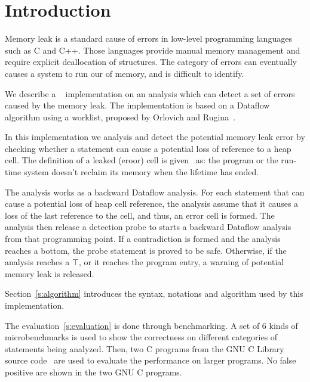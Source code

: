 \section{Introduction}
Memory leak is a standard cause of errors in low-level programming languages
such as C and C++. Those languages provide manual memory management and require
explicit deallocation of structures. The category of errors can eventually
causes a system to run our of memory, and is difficult to identify.

We describe a \llvm~\cite{llvm} implementation on an analysis which
can detect a set of errors caused by the memory leak. The implementation is
based on a Dataflow algorithm using a worklist, proposed by Orlovich and 
Rugina~\cite{rugina}.

In this implementation we analysis and detect the potential memory leak error
by checking whether a statement can cause a potential loss of reference to a 
heap cell. The definition of a leaked (eroor) cell is given~\cite{rugina} as: the 
program or the run-time system doesn't reclaim its memory when the lifetime 
has ended.

The analysis works as a backward Dataflow analysis. For each statement that 
can cause a potential loss of heap cell reference, the analysis assume that 
it causes a loss of the last reference to the cell, and thus, an error cell
is formed. The analysis then release a detection probe to starts a backward 
Dataflow analysis from that programming point. If a contradiction is formed 
and the analysis reaches a bottom, the probe statement is proved to be safe. 
Otherwise, if the analysis reaches a $\top$, or it reaches the program entry, 
a warning of potential memory leak is released.

Section~\ref{s:algorithm} introduces the syntax, notations and algorithm
used by this implementation.

The evaluation~\ref{s:evaluation} is done through benchmarking. A set of 6 kinds
of microbenchmarks is used to show the correctness on different categories of
statements being analyzed. Then, two C programs from the GNU C Library source
code~\cite{glibc} are used to evaluate the performance on larger programs. No 
false positive are shown in the two GNU C programs.
